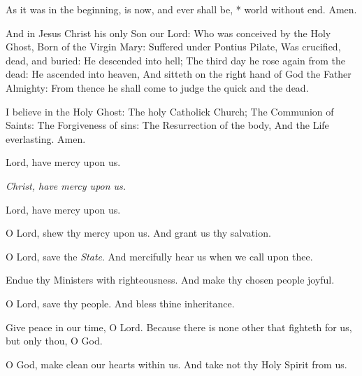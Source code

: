 As it was in the beginning, is now, and ever shall be, * world without end. Amen.

\bigskip
{}


And in Jesus Christ his only Son our Lord: Who was conceived by the Holy Ghost, Born of the Virgin Mary: Suffered under Pontius Pilate, Was crucified, dead, and buried: He descended into hell; The third day he rose again from the dead: He ascended into heaven, And sitteth on the right hand of God the Father Almighty: From thence he shall come to judge the quick and the dead.

I believe in the Holy Ghost: The holy Catholick Church; The Communion of Saints: The Forgiveness of sins: The Resurrection of the body, And the Life everlasting. Amen.


\bigskip
{}

\centerline{Lord, have mercy upon us.}
\centerline{\emph{Christ, have mercy upon us.}}
\centerline{Lord, have mercy upon us.}



\V O Lord, shew thy mercy upon us.  \R And grant us thy salvation.

\V O Lord, save the \emph{State}.  \R And mercifully hear us when we call upon thee.

\V Endue thy Ministers with righteousness.  \R And make thy chosen people joyful.

\V  O Lord, save thy people.  \R And bless thine inheritance.

\V Give peace in our time, O Lord.  \R Because there is none other that fighteth for us, but only thou, O God.

\V O God, make clean our hearts within us.  \R And take not thy Holy Spirit from us.

